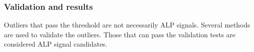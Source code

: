 



\subsubsection{Validation and results}

Outliers that pass the threshold are not necessarily ALP signals.
Several methods are used to validate the outliers.
Those that can pass the validation tests are considered ALP signal candidates.

